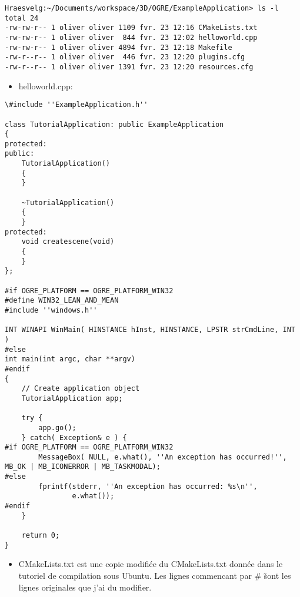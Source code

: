 \begin{lstlisting}
Hraesvelg:~/Documents/workspace/3D/OGRE/ExampleApplication> ls -l
total 24
-rw-rw-r-- 1 oliver oliver 1109 fvr. 23 12:16 CMakeLists.txt
-rw-rw-r-- 1 oliver oliver  844 fvr. 23 12:02 helloworld.cpp
-rw-rw-r-- 1 oliver oliver 4894 fvr. 23 12:18 Makefile
-rw-r--r-- 1 oliver oliver  446 fvr. 23 12:20 plugins.cfg
-rw-r--r-- 1 oliver oliver 1391 fvr. 23 12:20 resources.cfg
\end{lstlisting}




\begin{itemize}
\item helloworld.cpp:
\end{itemize}


\begin{lstlisting}
\#include ''ExampleApplication.h''
 
class TutorialApplication: public ExampleApplication
{
protected:
public:
    TutorialApplication()
    {
    }
 
    ~TutorialApplication()
    {
    }
protected:
    void createscene(void)
    {
    }
};
 
#if OGRE_PLATFORM == OGRE_PLATFORM_WIN32
#define WIN32_LEAN_AND_MEAN
#include ''windows.h''
 
INT WINAPI WinMain( HINSTANCE hInst, HINSTANCE, LPSTR strCmdLine, INT )
#else
int main(int argc, char **argv)
#endif
{
    // Create application object
    TutorialApplication app;
 
    try {
        app.go();
    } catch( Exception& e ) {
#if OGRE_PLATFORM == OGRE_PLATFORM_WIN32
        MessageBox( NULL, e.what(), ''An exception has occurred!'', MB_OK | MB_ICONERROR | MB_TASKMODAL);
#else
        fprintf(stderr, ''An exception has occurred: %s\n'',
                e.what());
#endif
    }
 
    return 0;
}
\end{lstlisting}


\begin{itemize}
\item CMakeLists.txt est une copie modifiée du CMakeLists.txt donnée dans le tutoriel de compilation sous Ubuntu. Les lignes commencant par \# \~ sont les lignes originales que j'ai du modifier.
\end{itemize}




